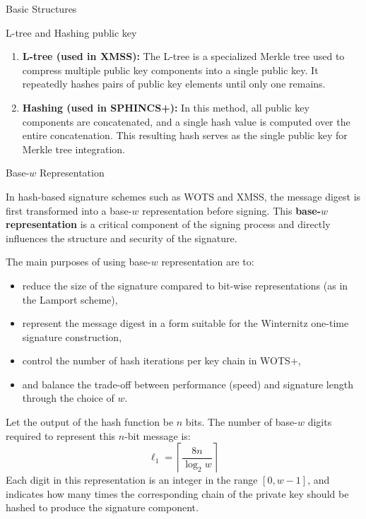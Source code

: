 \begin{section}{Basic Structures}{\label{sec1}}
\begin{subsection}{L-tree and Hashing public key}{\label{sec:L-tree}}
    \begin{enumerate}
        \item \textbf{L-tree (used in XMSS):} The L-tree is a specialized Merkle tree used to compress multiple public key components into a single public key. It repeatedly hashes pairs of public key elements until only one remains.
    
        \item \textbf{Hashing (used in SPHINCS+):} In this method, all public key components are concatenated, and a single hash value is computed over the entire concatenation. This resulting hash serves as the single public key for Merkle tree integration.
    \end{enumerate}

    
\end{subsection}

\begin{subsection}{Base-\texorpdfstring{$w$}{w} Representation }

In hash-based signature schemes such as WOTS and XMSS, the message digest is first transformed into a base-$w$ representation before signing. This \textbf{base-$w$ representation} is a critical component of the signing process and directly influences the structure and security of the signature.

The main purposes of using base-$w$ representation are to:

\begin{itemize}
    \item reduce the size of the signature compared to bit-wise representations (as in the Lamport scheme),
    \item represent the message digest in a form suitable for the Winternitz one-time signature construction,
    \item control the number of hash iterations per key chain in WOTS+,
    \item and balance the trade-off between performance (speed) and signature length through the choice of $w$.
\end{itemize}

Let the output of the hash function be $n$ bits. The number of base-$w$ digits required to represent this $n$-bit message is:
\[
\ell_1 = \left\lceil \frac{8n}{\log_2 w} \right\rceil
\]
Each digit in this representation is an integer in the range $[0, w-1]$, and indicates how many times the corresponding chain of the private key should be hashed to produce the signature component.


\end{subsection}
\end{section}
